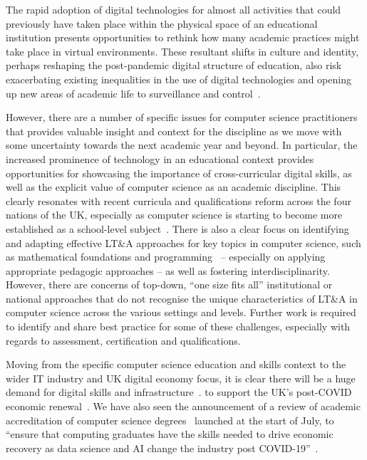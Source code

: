 \documentclass[sigconf]{acmart}
\begin{document}
The rapid adoption of digital technologies for almost all activities
that could previously have taken place within the physical space of an
educational institution presents opportunities to rethink how many
academic practices might take place in virtual environments. These
resultant shifts in culture and identity, perhaps reshaping the
post-pandemic digital structure of education, also risk exacerbating
existing inequalities in the use of digital technologies and opening
up new areas of academic life to surveillance and
control~\cite{carriganlseblog:2020}.

However, there are a number of specific issues for computer science
practitioners that provides valuable insight and context for the
discipline as we move with some uncertainty towards the next academic
year and beyond. In particular, the increased prominence of technology
in an educational context provides opportunities for showcasing the
importance of cross-curricular digital skills, as well as the explicit
value of computer science as an academic discipline. This clearly
resonates with recent curricula and qualifications reform across the
four nations of the UK, especially as computer science is starting to
become more established as a school-level
subject~\cite{crick+sentance:2011,wgictreview:2013,brown-et-al-toce2014,moller+crick:jce2018}. There
is also a clear focus on identifying and adapting effective LT\&A
approaches for key topics in computer science, such as mathematical
foundations and
programming~\cite{davenport-et-al:latice2016,murphy-et-al:programming2017,crick-et-al:fie2019,prickett-et-al:iticse2020}
-- especially on applying appropriate pedagogic approaches -- as well
as fostering interdisciplinarity. However, there are concerns of top-down, ``one size fits all'' institutional or national approaches that do not
recognise the unique characteristics of LT\&A in computer science
across the various settings and levels. Further work is required to
identify and share best practice for some of these challenges,
especially with regards to assessment, certification and qualifications.

Moving from the specific computer science education and skills context
to the wider IT industry and UK digital economy focus, it is clear there
will be a huge demand for digital skills and
infrastructure~\cite{tryfonas+crick:petra2018,davenport-et-al:educon2020,bcs:2020}.
to support the UK's post-COVID economic
renewal~\cite{dowdenspeech:2020,nadellaft:2020}. We have also seen the
announcement of a review of academic accreditation of computer science
degrees~\cite{crick-et-al:fie2019,crick-et-al-accred:cep2020} launched
at the start of July, to ``ensure that computing graduates have the
skills needed to drive economic recovery as data science and AI change
the industry post COVID-19''~\cite{bcscsdegrev:2020}.
\end{document}
